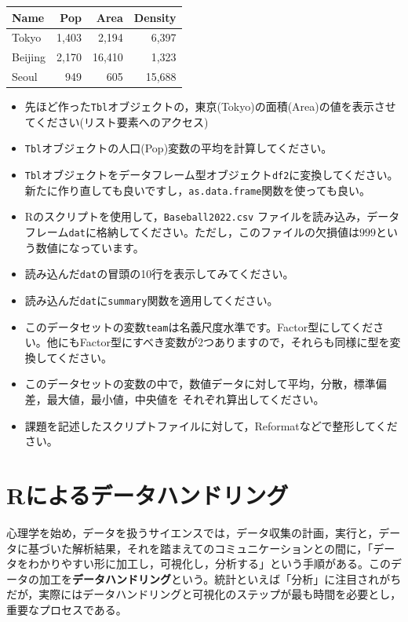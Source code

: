 \documentclass[
  a4paper,
]{ltjsbook}
\begin{document}
\begin{longtable}[]{@{}lrrr@{}}
\toprule\noalign{}
Name & Pop & Area & Density \\
\midrule\noalign{}
\endhead
\bottomrule\noalign{}
\endlastfoot
Tokyo & 1,403 & 2,194 & 6,397 \\
Beijing & 2,170 & 16,410 & 1,323 \\
Seoul & 949 & 605 & 15,688 \\
\end{longtable}

\begin{itemize}
\item
  先ほど作った\texttt{Tbl}オブジェクトの，東京(Tokyo)の面積(Area)の値を表示させてください(リスト要素へのアクセス)
\item
  \texttt{Tbl}オブジェクトの人口(Pop)変数の平均を計算してください。
\item
  \texttt{Tbl}オブジェクトをデータフレーム型オブジェクト\texttt{df2}に変換してください。新たに作り直しても良いですし，\texttt{as.data.frame}関数を使っても良い。
\item
  Rのスクリプトを使用して，\texttt{Baseball2022.csv}
  ファイルを読み込み，データフレーム\texttt{dat}に格納してください。ただし，このファイルの欠損値は\(999\)という数値になっています。
\item
  読み込んだ\texttt{dat}の冒頭の10行を表示してみてください。
\item
  読み込んだ\texttt{dat}に\texttt{summary}関数を適用してください。
\item
  このデータセットの変数\texttt{team}は名義尺度水準です。Factor型にしてください。他にもFactor型にすべき変数が2つありますので，それらも同様に型を変換してください。
\item
  このデータセットの変数の中で，数値データに対して平均，分散，標準偏差，最大値，最小値，中央値を
  それぞれ算出してください。
\item
  課題を記述したスクリプトファイルに対して，Reformatなどで整形してください。
\end{itemize}


\chapter{Rによるデータハンドリング}\label{rux306bux3088ux308bux30c7ux30fcux30bfux30cfux30f3ux30c9ux30eaux30f3ux30b0}

心理学を始め，データを扱うサイエンスでは，データ収集の計画，実行と，データに基づいた解析結果，それを踏まえてのコミュニケーションとの間に，「データをわかりやすい形に加工し，可視化し，分析する」という手順がある。このデータの加工を\textbf{データハンドリング}という。統計といえば「分析」に注目されがちだが，実際にはデータハンドリングと可視化のステップが最も時間を必要とし，重要なプロセスである。
\end{document}
